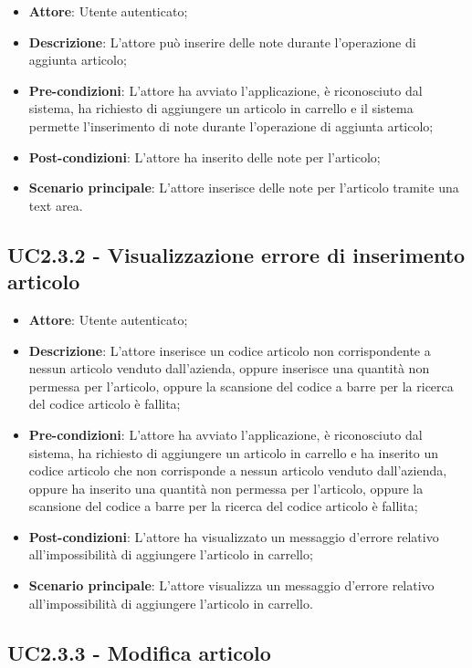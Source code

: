 \begin{itemize}
	\item \textbf{Attore}: Utente autenticato;
	\item \textbf{Descrizione}: L'attore può inserire delle note durante l'operazione di aggiunta articolo;
	\item \textbf{Pre-condizioni}: L'attore ha avviato l'applicazione, è riconosciuto dal sistema, ha richiesto di aggiungere un articolo in carrello e il sistema permette l'inserimento di note durante l'operazione di aggiunta articolo;
	\item \textbf{Post-condizioni}: L'attore ha inserito delle note per l'articolo;
	\item \textbf{Scenario principale}: L'attore inserisce delle note per l'articolo tramite una text area.
\end{itemize}

\subsection{UC2.3.2 - Visualizzazione errore di inserimento articolo}

\begin{itemize}
	\item \textbf{Attore}: Utente autenticato;
	\item \textbf{Descrizione}: L'attore inserisce un codice articolo non corrispondente a nessun articolo venduto dall'azienda, oppure inserisce una quantità non permessa per l'articolo, oppure la scansione del codice a barre per la ricerca del codice articolo è fallita;
	\item \textbf{Pre-condizioni}: L'attore ha avviato l'applicazione, è riconosciuto dal sistema, ha richiesto di aggiungere un articolo in carrello e ha inserito un codice articolo che non corrisponde a nessun articolo venduto dall'azienda, oppure ha inserito una quantità non permessa per l'articolo, oppure la scansione del codice a barre per la ricerca del codice articolo è fallita;
	\item \textbf{Post-condizioni}: L'attore ha visualizzato un messaggio d'errore relativo all'impossibilità di aggiungere l'articolo in carrello;
	\item \textbf{Scenario principale}: L'attore visualizza un messaggio d'errore relativo all'impossibilità di aggiungere l'articolo in carrello.
\end{itemize}

\subsection{UC2.3.3 - Modifica articolo}

